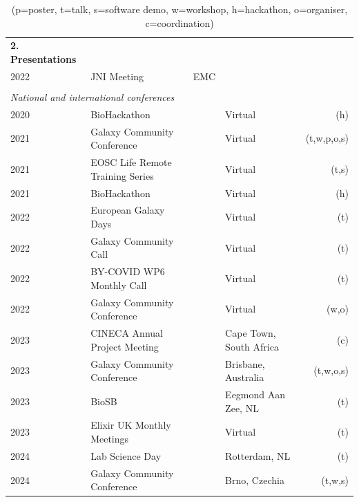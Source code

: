 \begin{table}[h!t]
    \begin{tabular}{llp{0.2cm}lr}
        \textbf{2. Presentations} \\
        2022 & JNI Meeting       & EMC \\

        \\\multicolumn{4}{l}{\textit{National and international conferences}} \\
        2020 & BioHackathon                     &  & Virtual             & (h) \\
        2021 & Galaxy Community Conference      &  & Virtual             & (t,w,p,o,s) \\
        2021 & EOSC Life Remote Training Series &  & Virtual             & (t,s) \\
        2021 & BioHackathon                     &  & Virtual             & (h) \\
        2022 & European Galaxy Days             &  & Virtual             & (t) \\
        2022 & Galaxy Community Call            &  & Virtual             & (t) \\
        2022 & BY-COVID WP6 Monthly Call        &  & Virtual             & (t) \\
        2022 & Galaxy Community Conference      &  & Virtual             & (w,o) \\
        2023 & CINECA Annual Project Meeting    &  & Cape Town, South Africa & (c) \\
        2023 & Galaxy Community Conference      &  & Brisbane, Australia & (t,w,o,s) \\
        2023 & BioSB                            &  & Eegmond Aan Zee, NL & (t) \\
        2023 & Elixir UK Monthly Meetings       &  & Virtual             & (t) \\
        2024 & Lab Science Day                  &  & Rotterdam, NL       & (t) \\
        2024 & Galaxy Community Conference      &  & Brno, Czechia       & (t,w,s) \\

    \end{tabular}
    \caption*{(p=poster, t=talk, s=software demo, w=workshop, h=hackathon, o=organiser, c=coordination)}
\end{table}

